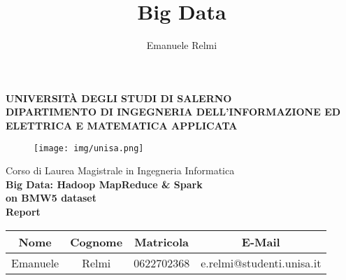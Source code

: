 \documentclass[a4paper, oneside]{book}
\title{Big Data}
\author{Emanuele Relmi}
\begin{document}
	\begin{titlepage}
		\begin{center}
			\LARGE{\uppercase{\textbf{Università degli Studi di Salerno}}}\\
			\vspace{5mm}
			\uppercase{\normalsize \textbf{Dipartimento di Ingegneria dell'Informazione ed Elettrica e Matematica Applicata} }\\
		\end{center}

		\begin{figure}[H]
			\centering
			\texttt{[image: img/unisa.png]}
		\end{figure}

		\begin{center}
			\normalsize{Corso di Laurea Magistrale in Ingegneria Informatica}\\
			\vspace{20mm}
			{\LARGE{\textbf{Big Data: Hadoop MapReduce \& Spark \\ on BMW5 dataset}}}\\
			\vspace{15mm}
			{\LARGE{\textbf{Report}}}
			\vspace{3mm}
		\end{center}

		\vspace{15mm}

		\begin{center}
			\begin{tabular}{| c | c | c | c |}
				\hline
				\textbf{Nome} & \textbf{Cognome} & \textbf{Matricola} & \textbf{E-Mail}           \\ \hline
				Emanuele          & Relmi            & 0622702368         & e.relmi@studenti.unisa.it \\
				\hline
			\end{tabular}
		\end{center}

		\vspace{30mm}


	\end{titlepage}

	\tableofcontents
	\clearpage
	\sloppy

    
	
	
    
    
    \listoftables
\end{document}
